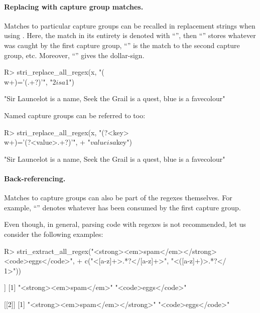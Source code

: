 \documentclass[nojss]{jss}
\begin{document}
\paragraph{Replacing with capture group matches.}
Matches to particular capture groups can be recalled in replacement strings
when using .
Here, the match in its entirety is denoted with ``'',  then
``'' stores whatever was caught by the first capture group,
``'' is the match to the second capture group, etc.
Moreover, ``\code{\textbackslash{}\$}'' gives the dollar-sign.


\begin{Schunk}
\begin{Sinput}
R> stri_replace_all_regex(x, "(\\w+)='(.+?)'", "$2 is a $1")
\end{Sinput}
\begin{Soutput}
[1] "Sir Launcelot is a name, Seek the Grail is a quest, blue is a favecolour"
\end{Soutput}
\end{Schunk}

Named capture groups can be referred to too:

\begin{Schunk}
\begin{Sinput}
R> stri_replace_all_regex(x, "(?<key>\\w+)='(?<value>.+?)'",
+    "${value} is a ${key}")
\end{Sinput}
\begin{Soutput}
[1] "Sir Launcelot is a name, Seek the Grail is a quest, blue is a favecolour"
\end{Soutput}
\end{Schunk}

\paragraph{Back-referencing.}
Matches to capture groups can also be part of the regexes themselves.
For example, ``'' denotes whatever
has been consumed by the first capture group.

Even though, in general, parsing  code with regexes is
not recommended, let us consider the following examples:

\begin{Schunk}
\begin{Sinput}
R> stri_extract_all_regex("<strong><em>spam</em></strong><code>eggs</code>",
+    c("<[a-z]+>.*?</[a-z]+>", "<([a-z]+)>.*?</\\1>"))
\end{Sinput}
\begin{Soutput}
[[1]]
[1] "<strong><em>spam</em>" "<code>eggs</code>"

[[2]]
[1] "<strong><em>spam</em></strong>" "<code>eggs</code>"
\end{Soutput}
\end{Schunk}
\end{document}
